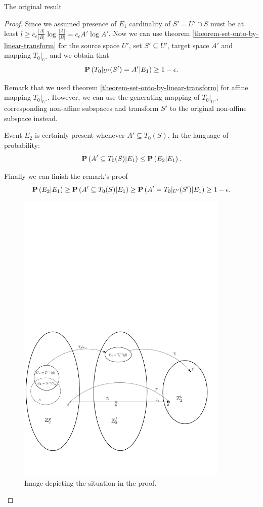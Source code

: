 \begin{section}{The original result}
\begin{proof}
Since we assumed presence of $E_1$ cardinality of $S' = U' \cap S$ must be at least $l \geq c_{\epsilon}\frac{|A|}{|B|} \log\frac{|A|}{|B|} = c_{\epsilon}{A'}\log{A'}$. Now we can use theorem \ref{theorem-set-onto-by-linear-transform} for the source space $U'$, set $S' \subseteq U'$, target space $A'$ and mapping $T_0|_{U'}$ and we obtain that 
\[
	\mathbf{P}\left(T_0|_{U'}(S') = A' | E_1\right) \geq 1 - \epsilon \text{.}
\]

Remark that we used theorem \ref{theorem-set-onto-by-linear-transform} for affine mapping $T_0|_{U'}$. However, we can use the generating mapping of $T_0|_{U'}$, corresponding non-affine subspaces and transform $S'$ to the original non-affine subspace instead.

Event $E_2$ is certainly present whenever $A' \subseteq T_0(S)$. In the language of probability:
\[
	\mathbf{P}\left(A' \subseteq T_0(S) | E_1\right) \leq \mathbf{P}\left(E_2 | E_1\right) \text{.}
\]

Finally we can finish the remark's proof
\[
	\mathbf{P}\left(E_2 | E_1\right) \geq \mathbf{P}\left(A' \subseteq T_0(S) | E_1\right) \geq \mathbf{P}\left(A' = T_0|_{U'}(S') | E_1\right) \geq 1 - \epsilon \text{.}
\]

\begin{figure}
  \centering
    \includegraphics[width=0.9\textwidth]{images/elpsl_proof}
  \caption{Image depicting the situation in the proof.}
\end{figure}


\end{proof}
\end{section}
